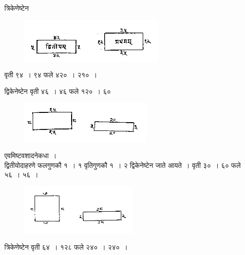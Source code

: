 \documentclass[11pt, openany]{book}
\begin{document}
त्रिकेणेष्टेन
\vspace{-4mm}

\begin{figure}[h!]
     \centering
     \includegraphics[scale=0.85]{graphics/capture131.png}
\end{figure} 
\vspace{-2mm}

वृती ९४~। ९४ फले ४२०~। २१०~।\\
\vspace{-4mm}

द्विकेनेष्टेन वृती ४६~। ४६ फले १२०~। ६०
\vspace{-2mm}

\begin{figure}[h!]
     \centering
     \includegraphics[scale=0.85]{graphics/capture132.png}
\end{figure} 
\vspace{-2mm}

एवमिष्टवशादनेकधा~। \\

\vspace{-4mm}
 द्वितीयोदाहरणे फलगुणकौ १~। १ वृतिगुणकौ १~। २ द्विकेनेष्टेन जाते आयते~। वृती ३०~। ६० फले ५६~। ५६~।
\vspace{-2mm}

\begin{figure}[h!]
     \centering
     \includegraphics[scale=0.85]{graphics/capture133.png}
\end{figure} 
\newpage%
त्रिकेणेष्टेन वृती ६४~। १२८ फले २४०~। २४०~।
\vspace{-2mm}
\end{document}
